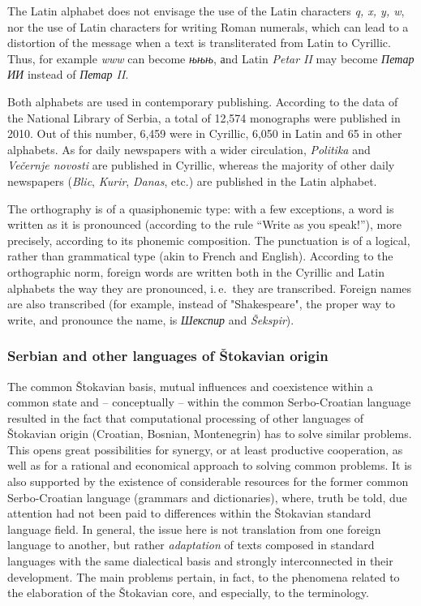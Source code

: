 \begin{multicols}{2}
The Latin alphabet does not envisage the use of the Latin characters \textit{q, x, y, w}, nor the use of Latin characters for writing Roman numerals, which can lead to a distortion of the message when a text is transliterated from Latin to Cyrillic.  Thus, for 
example \textit{www} can become \textit{њњњ}, аnd Latin \textit{Petar II} may become \textit{Петар ИИ} instead of \textit{Петар II}. 

Both alphabets are used in contemporary publishing. According to the data of the National Library of Serbia, a total of 12,574  monographs were published in 2010. Out of this number, 6,459 were in Cyrillic, 6,050 in Latin and 65 in other alphabets. As for daily newspapers with a wider circulation, \textit{Politika} and \textit{Večernje novosti} are published in Cyrillic, whereas the majority of other daily newspapers (\textit{Blic}, \textit{Kurir}, \textit{Danas}, etc.) are published in the Latin alphabet. 

The orthography is of a quasiphonemic type: with a few exceptions, a word is written as it is pronounced (according to the rule “Write as you speak!”), more precisely, according to its phonemic composition. 
The punctuation is of a logical, rather than grammatical type (akin to French and English).
According to the orthographic norm, foreign words are written both in the Cyrillic and Latin alphabets the way they are pronounced, i.\,e.~they are transcribed. Foreign names are also transcribed (for example, instead of "Shakespeare", the proper way to write, and pronounce the name, is \textit{Шекспир} and \textit{Šekspir}).

\subsubsection {Serbian and other languages of Štokavian origin}

The common Štokavian basis, mutual influences and coexistence within a common state and – conceptually – within the common Serbo-Croatian language resulted in the fact that computational processing of other languages of Štokavian origin (Croatian, Bosnian, Montenegrin) has to solve similar problems. This opens great possibilities for synergy, or at least productive cooperation, as well as for a rational and economical approach to solving common problems. It is also supported by the existence of considerable resources for the former common Serbo-Croatian language (grammars and dictionaries), where, truth be told, due attention had not been paid to differences within the Štokavian standard language field. In general, the issue here is not translation from one foreign language to another, but rather \textit{adaptation} of texts composed in standard languages with the same dialectical basis and strongly interconnected in their development. 
The main problems pertain, in fact, to the phenomena related to the elaboration of the Štokavian core, and especially, to the terminology.


\end{multicols}
